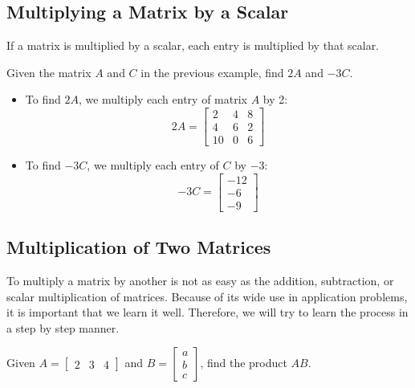 \subsection{Multiplying a Matrix by a Scalar}

If a matrix is multiplied by a scalar, each entry is multiplied by that scalar.

\begin{example}
    Given the matrix $A$ and $C$ in the previous example, find $2A$ and $-3C$.
\end{example}

\begin{solution}
    \begin{itemize}
        \item To find $2A$, we multiply each entry of matrix $A$ by 2:
              \[
                  2A = \begin{bmatrix} 2 & 4 & 8 \\ 4 & 6 & 2 \\ 10 & 0 & 6 \end{bmatrix}
              \]
        \item To find $-3C$, we multiply each entry of $C$ by $-3$:
              \[
                  -3C = \begin{bmatrix} -12 \\ -6 \\ -9 \end{bmatrix}
              \]
    \end{itemize}
\end{solution}

\subsection{Multiplication of Two Matrices}

To multiply a matrix by another is not as easy as the addition, subtraction, or scalar multiplication of matrices. Because of its wide use in application problems, it is important that we learn it well. Therefore, we will try to learn the process in a step by step manner.

\begin{example}
    Given $A = \begin{bmatrix} 2 & 3 & 4 \end{bmatrix}$ and $B = \begin{bmatrix} a \\ b \\ c \end{bmatrix}$, find the product $AB$.
\end{example}

